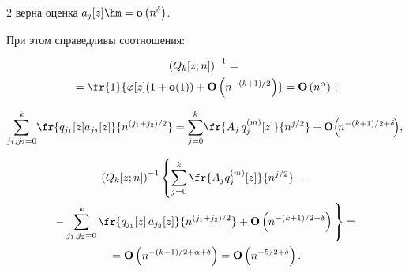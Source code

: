 \begin{multicols}{2}
 верна оценка $a_j[z]\hm=\op\left(n^{\delta}\right)$.


    При этом справедливы соотношения:


 \begin{multline*}


  \left(Q_k[z;n]\right)^{-1}={}\\


  {}=


 \fr{1}{\varphi[z](1+\op(1)) +\Op\left(n^{-(k+1)/2}\right)}=


 \Op\left(n^\alpha\right)\,;


\end{multline*}


\begin{equation*}


 \sum\limits_{j_1,j_2=0}^{k}\! \fr{q_{j_1}[z] a_{j_2}[z]}{n^{(j_1+j_2)/2}}


 = \sum\limits_{j=0}^k \! \fr{A_{j}\,q_{j}^{(m)}[z]}{n^{j/2}}+


 \Op\!\left(\!n^{-(k+1)/2+\delta}\!\right)\!,


 \end{equation*}





 \vspace*{-12pt}





 \noindent


 \begin{multline*}


 \left(Q_k[z;n]\right)^{-1}\left\{\sum\limits_{j=0}^k \fr{A_j q_j^{(m)}[z]}{n^{j/2}}-{}\right.\\


\left. {}-


 \sum\limits_{j_1,j_2=0}^{k} \fr{q_{j_1}[z]\,a_{j_2}[z]}{n^{(j_1+j_2)/2}}


 + \Op\left(n^{-(k+1)/2+\delta}\right)


\vphantom{\sum\limits_{j=0}^k}


\right\} ={}


\\


 {} =\Op\left(n^{-(k+1)/2+\alpha+\delta}\right)=


  \Op\left(n^{-5/2+\delta}\right).


 \end{multline*}






\end{multicols}
